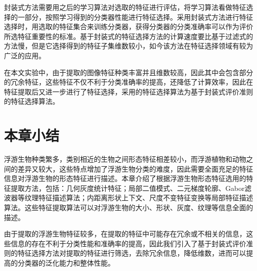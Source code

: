 封装式方法需要用之后的学习算法对选取的特征进行评估，将学习算法看做特征选择的一部分，按照学习得到的分类器性能进行特征选择。采用封装式方法进行特征选择时，用选取的特征集合来训练分类器，获得分类器的分类准确率可以作为评价所选特征重要性的标准。基于封装式的特征选择方法的计算速度要比基于过滤式的方法慢，但是它选择得到的特征子集维数较小，如今该方法在特征选择领域有较为广泛的应用。

在本文实验中，由于提取的图像特征种类丰富并且维数较高，因此其中会包含部分的冗余特征，这些特征不仅不利于分类准确率的提高，还降低了计算效率，因此在特征提取后又进一步进行了特征选择，采用的特征选择算法为基于封装式评价准则的特征选择算法。

\section{本章小结}

浮游生物种类繁多，类别相近的生物之间形态特征相差较小，而浮游植物和动物之间的差异又较大，这些特点增加了浮游生物分类的难度，因此需要全面充足的特征信息对浮游生物的形态特征进行描述。本章介绍了根据浮游生物形态特征选用的特征提取方法，包括：几何灰度统计特征；局部二值模式、二元梯度轮廓、Gabor滤波器等纹理特征描述算法；内距离形状上下文、尺度不变特征变换等局部特征描述算法。这些特征提取算法可以对浮游生物的大小、形状、灰度、纹理等信息全面的描述。

由于提取的浮游生物特征较多，在提取的特征中可能存在冗余或不相关的信息，这些信息的存在不利于分类性能和准确率的提高，因此我们引入了基于封装式评价准则的特征选择方法对提取的特征进行筛选，去除冗余信息，降低维数，进而可以提高的分类器的泛化能力和整体性能。










